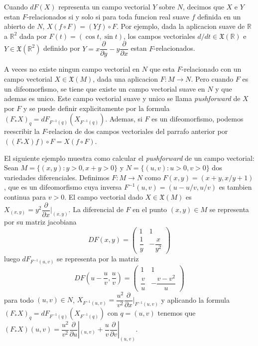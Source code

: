\documentclass[12pt]{extarticle}
\newcommand{\R}{\mathbb{R}}
\newcommand{\<}{\langle}
\renewcommand{\>}{\rangle}
\theoremstyle{definition}
\begin{document}
Cuando $dF(X)$ representa un campo vectorial $Y$ sobre $N$, decimos que $X$ e
$Y$ estan $F$-relacionados si y solo si para toda funcion real suave $f$
definida en un abierto de $N$, $X(f \circ F) = (Yf) \circ F$. Por ejemplo, dada la
aplicacion suave de $\R$ a $\R^2$ dada por $F(t) = (\cos t, \sin t)$, los campos
vectoriales $d/dt \in \mathfrak{X}(\R)$ e $Y \in \mathfrak{X}(\R^2)$ definido
por $Y=x\dfrac{\partial}{\partial y} - y\dfrac{\partial}{\partial x}$ estan
$F$-relacionados.

A veces no existe ningun campo vectorial en $N$ que esta $F$-relacionado con un
campo vectorial $X  \in \mathfrak{X}(M)$, dada una aplicacion $F : M \rightarrow
N$. Pero cuando $F$ es un difeomorfismo, se tiene que existe un campo vectorial
suave en $N$ y que ademas es unico. Este campo vectorial suave y unico se llama
\emph{pushforward} de $X$ por $F$ y se puede definir explicitamente por la formula
$(F_*X)_q = dF_{F^{-1}(q)}(X_{F^{-1}(q)})$. Ademas, si $F$ es un difeomorfismo,
podemos reescribir la $F$-relacion de dos campos vectoriales del parrafo
anterior por $((F_*X)f) \circ F = X(f \circ F)$.

El siguiente ejemplo muestra como calcular el \emph{pushforward} de un campo
vectorial: Sean $M = \{(x, y): y>0, x+y > 0\}$ y $N = \{(u, v): u>0, v>0\}$ dos
variedades diferenciales. Definimos $F: M \rightarrow N$ como $F(x, y) =
(x+y,x/y + 1)$, que es un difeomorfismo cuya inversa $F^{-1}(u,v)=(u-u/v, u/v)$
es tambien continua para $v>0$. El campo vectorial dado $X \in \mathfrak{X}(M)$
es $X_{(x,y)} = y^2 \dfrac{\partial}{\partial x} |_{(x, y)}$. La diferencial de
$F$ en el punto $(x,y) \in M$ se representa por su matriz jacobiana
\begin{equation*}
	DF(x,y) = \begin{pmatrix}
		1 & 1 \\
		\dfrac{1}{y} & -\dfrac{x}{y^2}
	\end{pmatrix}
\end{equation*}
luego $dF_{F^{-1}(u,v)}$ se representa por la matriz
\begin{equation*}
	DF(u-\dfrac{u}{v},\dfrac{u}{v}) = \begin{pmatrix}
		1 & 1 \\
		\dfrac{v}{u} & -\dfrac{v - v^2}{u}
	\end{pmatrix}
\end{equation*}
para todo $(u, v) \in N$, $X_{F^{-1}(u, v)} =
\dfrac{u^2}{v^2}\dfrac{\partial}{\partial x}|_{F^{-1}(u,v)}$ y aplicando la
formula $(F_*X)_q = dF_{F^{-1}(q)}(X_{F^{-1}(q)})$ con $q=(u,v)$ tenemos que
$(F_*X)(u,v) = \dfrac{u^2}{v^2}\dfrac{\partial}{\partial u}|_{(u, v)} +
\dfrac{u}{v}\dfrac{\partial}{\partial v}|_{(u,v)}$.
\end{document}
